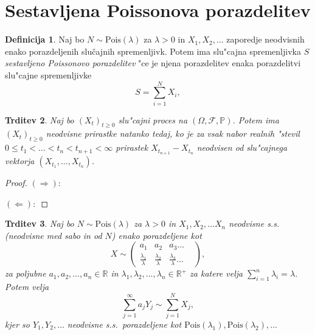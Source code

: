 \documentclass[12pt, a4paper, reqno]{amsart}
\theoremstyle{definition}
\newtheorem{definicija}{Definicija}[section]
\theoremstyle{plain}
\newtheorem{trditev}[definicija]{Trditev}
\newcommand{\R}{\mathbb{R}}
\newcommand{\F}{\mathcal{F}}
\newcommand{\1}{\mathds{1}}
\newcommand{\Pois}[1]{\text{Pois}(#1)}
\begin{document}
\section{Sestavljena Poissonova porazdelitev}

    \begin{definicija}
        Naj bo $N\sim \Pois{\lambda}$  za $\lambda >0$ in $X_1, X_2, \dots$ zaporedje neodvisnih
        enako porazdeljenih slučajnih spremenljivk. Potem ima slu"cajna spremenljivka $S$ \textit{sestavljeno
        Poissonovo porazdelitev} "ce je njena porazdelitev enaka porazdelitvi slu"cajne spremenljivke
        \begin{equation*}
            S = \sum_{i=1}^NX_i,
        \end{equation*}
    \end{definicija}

    \begin{trditev}
        Naj bo $(X_t)_{t\geq0}$ slu"cajni proces na $(\Omega, \F, \mathbb{P})$. Potem ima $(X_t)_{t\geq0}$
        neodvisne prirastke natanko tedaj, ko je za vsak nabor realnih "stevil 
        $0 \leq t_1 < \ldots < t_n < t_{n+1} <\infty$ prirastek $X_{t_{n+1}} - X_{t_n}$ neodvisen od
        slu"cajnega vektorja $(X_{t_1}, \dots, X_{t_n})$.
        \label{trd:ekvivKarakterizacija}
    \end{trditev}

    \begin{proof}
        $(\Rightarrow):$

        $(\Leftarrow):$
    \end{proof}

    \begin{trditev}
        Naj bo $N\sim \Pois{\lambda}$  za $\lambda >0$ in $X_1, X_2, \dots X_n$ neodvisne s.s. (neodvisne 
        med sabo in od $N$) enako porazdeljene kot
        $$ X\sim
        \begin{pmatrix}
            a_1 & a_2 & a_3  \dots & \\
            \tfrac{\lambda_1}{\lambda} & \tfrac{\lambda_2}{\lambda} & \tfrac{\lambda_3}{\lambda} \dots & 
        \end{pmatrix},
        $$
        za poljubne $a_1, a_2, \dots, a_n \in \R$ in 
        $\lambda_1, \lambda_2, \dots, \lambda_n \in \R^+$ za katere velja 
        ${\sum_{i=1}^n\lambda_i = \lambda}$.
        Potem velja 
        \begin{equation*}
            \sum_{j=1}^\infty a_jY_j \sim \sum_{j=1}^NX_j,
        \end{equation*}
        kjer so $Y_1,Y_2,  \dots$ neodvisne s.s.\ porazdeljene kot 
        $\Pois{\lambda_1},\Pois{\lambda_2}, \dots$
        \label{trd:NXjeEnakoaY}
    \end{trditev}
\end{document}
